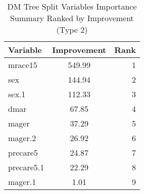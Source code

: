 \begingroup
\begin{table}[htbp]
\centering
\setlength{\tabcolsep}{0.5em}
\renewcommand{\arraystretch}{0.9}
\footnotesize
\caption{DM Tree Split Variables Importance Summary Ranked by Improvement (Type 2)}
\label{tab:var_imp_summary_type2}
\begin{tabular}{lcr}
\hline
Variable & Improvement & Rank \\ \hline
mrace15 & 549.99 & 1 \\
sex & 144.94 & 2 \\
sex.1 & 112.33 & 3 \\
dmar & 67.85 & 4 \\
mager & 37.29 & 5 \\
mager.2 & 26.92 & 6 \\
precare5 & 24.87 & 7 \\
precare5.1 & 22.29 & 8 \\
mager.1 & 1.01 & 9 \\
\hline
\end{tabular}
\end{table}
\endgroup

